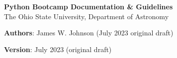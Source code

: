 \documentclass[12pt]{report}
\begin{document}
\begin{center}
\textbf{\Large Python Bootcamp Documentation \& Guidelines}
\\
{\large The Ohio State University, Department of Astronomy}
\end{center}
\par\noindent
\textbf{Authors}: James W. Johnson (July 2023 original draft)
\par\noindent
\textbf{Version}: July 2023 (original draft)






\end{document}
